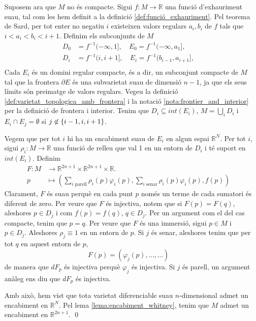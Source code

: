{    Suposem ara que $M$ no és compacte. Sigui $f:M\to \mathbb R$ una funció d'exhauriment suau, tal com les hem definit a la definició \ref{def:funció_exhauriment}. Pel teorema de Sard, per tot enter no negatiu $i$ existeixen valors regulars $a_i,b_i$ de $f$ tals que $i<a_i<b_i<i+1$. Definim els subconjunts de $M$
    \begin{align*}
        D_0 &= f^{-1}(-\infty,1],\quad E_0 = f^{-1}(-\infty,a_1],\\
        D_i &= f^{-1}(i,i+1],\quad E_i = f^{-1}(b_{i-1},a_{i+1}],\\
    \end{align*}
    Cada $E_i$ és un domini regular compacte, és a dir, un subconjunt compacte de $M$ tal que la frontera $\partial E$ és una subvarietat suau de dimensió $n-1$, ja que els seus límits són preimatge de valors regulars. Vegeu la definició \ref{def:varietat_topologica_amb_frontera} i la notació \ref{nota:frontier_and_interior} per la definició de frontera i interior. Tenim que $D_i\subseteq int(E_i)$, $M=\bigcup_i D_i$ i $E_i\cap E_j = \emptyset$ si $j\not\in\{i-1,i,i+1\}$. 

    Vegem que per tot $i$ hi ha un encabiment suau de $E_i$ en algun espai $\mathbb R^N$. Per tot $i$, sigui $\rho_i:M\to \mathbb R$ una funció de relleu que val 1 en un entorn de $D_i$ i té suport en $int(E_i)$. Definim
    \begin{align*}
        F:M&\to\mathbb R^{2n + 1}\times\mathbb R^{2n + 1}\times\mathbb R.\\
        p&\mapsto \left(    \sum_{i\text{ parell}}    \rho_i(p)\varphi_i(p), \sum_{i\text{ senar}}    \rho_i(p)\varphi_i(p), f(p)\right)
    \end{align*}
    Clarament, $F$ és suau perquè en cada punt $p$ només un terme de cada sumatori és diferent de zero.
    Per veure que $F$ és injectiva, notem que si $F(p)=F(q)$, aleshores $p\in D_j$ i com $f(p)=f(q)$, $q\in D_j$. Per un argument com el del cas compacte, tenim que $p=q$.
    Per veure que $F$ és una immersió, sigui $p\in M$ i $p\in D_j$. Aleshores $\rho_j\equiv1$ en un entorn de $p$. Si $j$ és senar, aleshores tenim que per tot $q$ en aquest entorn de $p$, 
    \begin{equation*}
        F(p) = (\varphi_j(p),\dots,\dots)
    \end{equation*}
    de manera que $dF_p$ és injectiva perquè $\varphi_j$ és injectiva. Si $j$ és parell, un argument anàleg ens diu que $dF_p$ és injectiva. 

    Amb això, hem vist que tota varietat diferenciable suau $n$-dimensional admet un encabiment en $\mathbb R^{N}$. Pel lema \ref{lema:encabiment_whitney}, tenim que $M$ admet un encabiment en $\mathbb R^{2n+1}$.
    \qed
}





